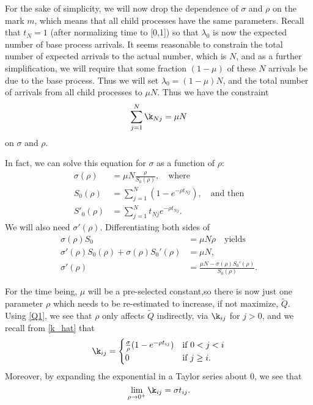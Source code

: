 \documentclass[12pt,leqno]{article}
\begin{document}
For the sake of simplicity, we will now drop the dependence of $\sigma$ and $\rho$ on the mark $m$, which means
that all child processes have the same parameters. Recall that $t_N = 1$ (after normalizing time to [0,1]) so that
$\lambda_0$ is now the expected number of base process arrivals.  It seems reasonable to constrain the total number
of expected arrivals to the actual number, which is $N$, and as a further simplification, we will require that
some fraction $(1-\mu)$ of these
$N$ arrivals be due to the base process.  Thus we will set $\lambda_0 = (1-\mu)N$,  and the total number of arrivals
from all child processes to $\mu N$. Thus we have the constraint
\begin{equation}\label{constraint}
\sum_{j=1}^N\k_{Nj} = \mu N
\end{equation}
on $\sigma$ and $\rho$.

In fact, we can solve this equation for $\sigma$ as a function of $\rho$:
\begin{equation}\label{sigma(rho)}
  \begin{split}
    \sigma(\rho) &= \mu N\frac{\rho}{S_0(\rho)},\quad\text{where}\\
    S_0(\rho) &= \sum_{j=1}^N(1-e^{-\rho t_{Nj}}), \quad\text{and then}\\
    S'_0(\rho) &= \sum_{j=1}^N t_{Nj}e^{-\rho t_{Nj}}.
  \end{split}
\end{equation}
  We will also need $\sigma'(\rho)$.  Differentiating both sides of
\begin{equation}
  \begin{split}
    \sigma(\rho)S_0 &= \mu N\rho \quad\text{yields}\\
    \sigma'(\rho)S_0(\rho) + \sigma(\rho)S_0'(\rho)  &= \mu N,\\
    \sigma'(\rho) &= \frac{\mu N - \sigma(\rho)S_0'(\rho)}{S_0(\rho)}.
  \end{split}
\end{equation}

For the time being, $\mu$ will be a pre-selected constant,so there is now just one parameter 
$\rho$ which needs to be re-estimated to increase, if not maximize, $\tilde{Q}$.  
Using \eqref{Q1}, we see that $\rho$ only affects $\tilde{Q}$ indirectly, via $\k_{ij}$ for $j > 0$, and we recall
from \eqref{k_hat} that
$$
\k_{ij} = \begin{cases}
\frac{\sigma}{\rho}(1-e^{-\rho{t_{ij}}}) & \text{if $0 < j < i$}\\
0 &\text{if $j\ge i$}.
\end{cases}
$$
Moreover, by expanding the exponential in a Taylor series about 0, we see that
\begin{equation}\label{k_hat(0)}
\lim_{\rho\rightarrow{0^+}}\k_{ij} = \sigma{t_{ij}}.
\end{equation}
\end{document}
